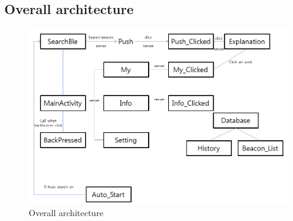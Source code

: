 \documentclass[conference]{IEEEtran}
\begin{document}
\subsection{Overall architecture}
\begin{figure}[htbp]
\begin{center}
    \includegraphics[scale=0.5]{img_archi}
    \caption{Overall architecture} 
\end{center}
\end{figure}
\end{document}
